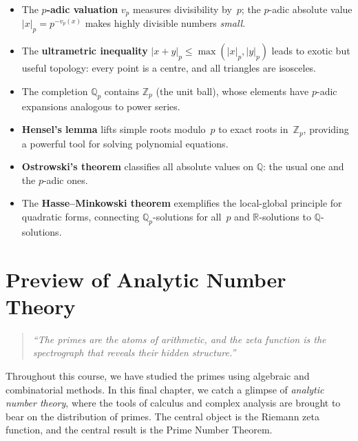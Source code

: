 \documentclass[12pt,a4paper,openany]{book}
\theoremstyle{definition}
\theoremstyle{plain}
\theoremstyle{remark}
\newcommand{\Z}{\mathbb{Z}}
\newcommand{\Q}{\mathbb{Q}}
\newcommand{\R}{\mathbb{R}}
\newcommand{\abs}[1]{\left|#1\right|}
\begin{document}
\begin{itemize}
  \item The \textbf{$p$-adic valuation} $v_p$ measures divisibility by~$p$;
    the $p$-adic absolute value $\abs{x}_p = p^{-v_p(x)}$ makes highly divisible
    numbers \emph{small}.
  \item The \textbf{ultrametric inequality}
    $\abs{x+y}_p \leq \max(\abs{x}_p, \abs{y}_p)$ leads to exotic but useful
    topology: every point is a centre, and all triangles are isosceles.
  \item The completion $\Q_p$ contains $\Z_p$ (the unit ball), whose elements
    have $p$-adic expansions analogous to power series.
  \item \textbf{Hensel's lemma} lifts simple roots modulo~$p$ to exact roots
    in~$\Z_p$, providing a powerful tool for solving polynomial equations.
  \item \textbf{Ostrowski's theorem} classifies all absolute values on $\Q$:
    the usual one and the $p$-adic ones.
  \item The \textbf{Hasse--Minkowski theorem} exemplifies the local-global
    principle for quadratic forms, connecting $\Q_p$-solutions for all~$p$ and
    $\R$-solutions to $\Q$-solutions.
\end{itemize}



\chapter{Preview of Analytic Number Theory}
\label{ch:analytic-nt}

\begin{quote}
\emph{``The primes are the atoms of arithmetic, and the zeta function is the
  spectrograph that reveals their hidden structure.''}
\end{quote}

\noindent
Throughout this course, we have studied the primes using algebraic and
combinatorial methods. In this final chapter, we catch a glimpse of
\emph{analytic number theory}, where the tools of
calculus and complex analysis are brought to bear on the distribution of primes.
The central object is the Riemann zeta function, and the central result is the
Prime Number Theorem.
\end{document}
